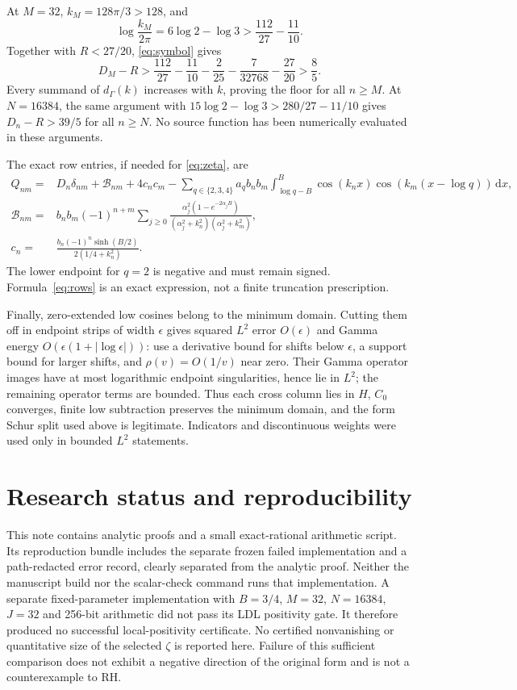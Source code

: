 \documentclass[11pt]{article}
\newcommand{\dd}{\,\mathrm d}
\begin{document}
At $M=32$, $k_M=128\pi/3>128$, and
\[
 \log\frac{k_M}{2\pi}=6\log2-\log3>\frac{112}{27}-\frac{11}{10}.
\]
Together with $R<27/20$, \eqref{eq:symbol} gives
\[
 D_M-R>\frac{112}{27}-\frac{11}{10}-\frac2{25}-\frac7{32768}-\frac{27}{20}>\frac85.
\]
Every summand of $d_\Gamma(k)$ increases with $k$, proving the floor for all $n\ge M$. At $N=16384$, the same argument with $15\log2-\log3>280/27-11/10$ gives $D_n-R>39/5$ for all $n\ge N$. No source function has been numerically evaluated in these arguments.

The exact row entries, if needed for \eqref{eq:zeta}, are
\begin{align}
 Q_{nm}={}&D_n\delta_{nm}+\mathcal B_{nm}+4c_nc_m
 -\sum_{q\in\{2,3,4\}}a_qb_nb_m
   \int_{\log q-B}^B\cos(k_nx)\cos(k_m(x-\log q))\dd x,\nonumber\\
 \mathcal B_{nm}={}&b_nb_m(-1)^{n+m}\sum_{j\ge0}
 \frac{\alpha_j^2(1-e^{-2\alpha_jB})}
      {(\alpha_j^2+k_n^2)(\alpha_j^2+k_m^2)},\label{eq:rows}\\
 c_n={}&\frac{b_n(-1)^n\sinh(B/2)}{2(1/4+k_n^2)}.\nonumber
\end{align}
The lower endpoint for $q=2$ is negative and must remain signed. Formula~\eqref{eq:rows} is an exact expression, not a finite truncation prescription.

Finally, zero-extended low cosines belong to the minimum domain. Cutting them off in endpoint strips of width $\epsilon$ gives squared $L^2$ error $O(\epsilon)$ and Gamma energy $O(\epsilon(1+|\log\epsilon|))$: use a derivative bound for shifts below $\epsilon$, a support bound for larger shifts, and $\rho(v)=O(1/v)$ near zero. Their Gamma operator images have at most logarithmic endpoint singularities, hence lie in $L^2$; the remaining operator terms are bounded. Thus each cross column lies in $H$, $C_0$ converges, finite low subtraction preserves the minimum domain, and the form Schur split used above is legitimate. Indicators and discontinuous weights were used only in bounded $L^2$ statements.

\clearpage
\section*{Research status and reproducibility}
This note contains analytic proofs and a small exact-rational arithmetic script. Its reproduction bundle includes the separate frozen failed implementation and a path-redacted error record, clearly separated from the analytic proof. Neither the manuscript build nor the scalar-check command runs that implementation. A separate fixed-parameter implementation with $B=3/4$, $M=32$, $N=16384$, $J=32$ and 256-bit arithmetic did not pass its LDL positivity gate. It therefore produced no successful local-positivity certificate. No certified nonvanishing or quantitative size of the selected $\zeta$ is reported here. Failure of this sufficient comparison does not exhibit a negative direction of the original form and is not a counterexample to RH.
\end{document}
